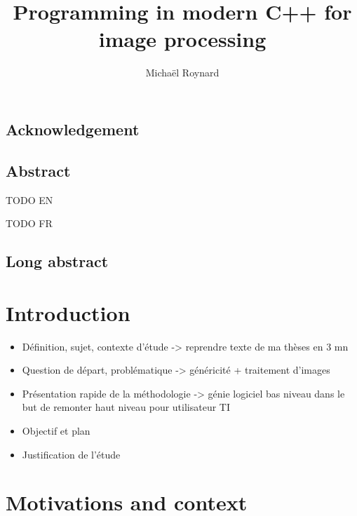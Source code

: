 \documentclass{book}
\begin{document}
%
\title{Programming in modern C++ for image processing}


\author{Michaël Roynard}



\maketitle

\section{Acknowledgement}


\section{Abstract}
  TODO EN

  TODO FR

\section{Long abstract}



\tableofcontents
\listoffigures
\listoftables

\cleardoublepage


\chapter{Introduction}

\begin{itemize}
  \item Définition, sujet, contexte d'étude -> reprendre texte de ma thèses en 3 mn
  \item Question de départ, problématique -> généricité + traitement d'images
  \item Présentation rapide de la méthodologie -> génie logiciel bas niveau dans le but de remonter haut niveau pour utilisateur TI
  \item Objectif et plan
  \item Justification de l'étude
\end{itemize}

\cleardoublepage


\chapter{Motivations and context}
\end{document}
